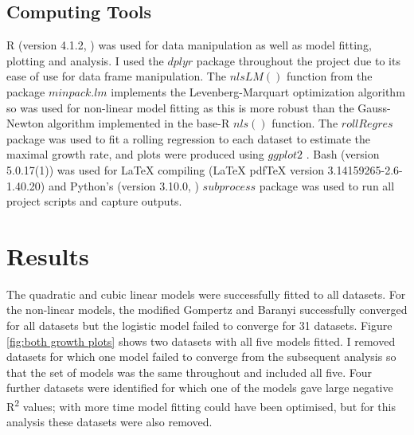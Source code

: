 \documentclass[11pt]{article}
\begin{document}
\begin{linenumbers}
        \subsection{Computing Tools}
        
            R (version 4.1.2, \citet{R_language_2021}) was used for data manipulation as well as model fitting, plotting and analysis. I used the $dplyr$ package \citep{dplyr_2021} throughout the project due to its ease of use for data frame manipulation. The $nlsLM()$ function from the package $minpack.lm$ \citep{minpack_2016} implements the Levenberg-Marquart optimization algorithm so was used for non-linear model fitting as this is more robust than the Gauss-Newton algorithm implemented in the base-R $nls()$ function. The $rollRegres$ package \citep{roll_Regres_2019} was used to fit a rolling regression to each dataset to estimate the maximal growth rate, and plots were produced using $ggplot2$ \citep{ggplot_2016}. Bash (version 5.0.17(1)) was used for LaTeX compiling (LaTeX pdfTeX version 3.14159265-2.6-1.40.20) and Python's (version 3.10.0, \citet{python_2009}) $subprocess$ package was used to run all project scripts and capture outputs. 
            

    \section{Results}
        
        The quadratic and cubic linear models were successfully fitted to all datasets. For the non-linear models, the modified Gompertz and Baranyi successfully converged for all datasets but the logistic model failed to converge for 31 datasets. Figure \ref{fig:both growth plots} shows two datasets with all five models fitted. I removed datasets for which one model failed to converge from the subsequent analysis so that the set of models was the same throughout and included all five. Four further datasets were identified for which one of the models gave large negative R\textsuperscript{2} values; with more time model fitting could have been optimised, but for this analysis these datasets were also removed. 
        

\end{linenumbers}
\end{document}
